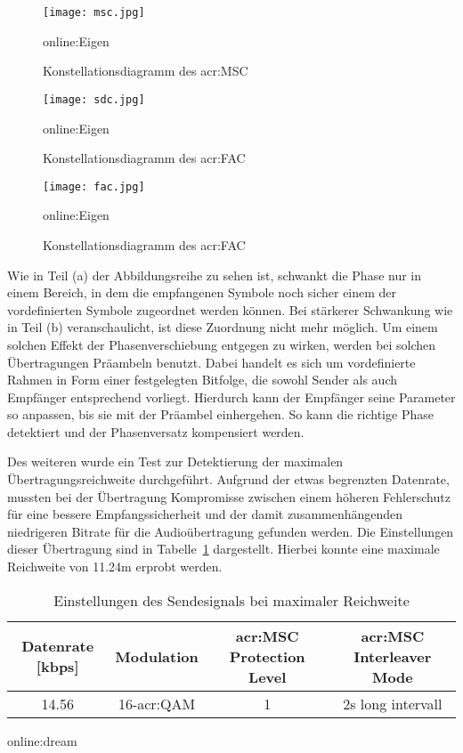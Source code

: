 \begin{figure}[h]
	\centering
	\texttt{[image: msc.jpg]}
	\caption[Konstellationsdiagramm des \gls{acr:MSC}]{Konstellationsdiagramm des \gls{acr:MSC}}\gls{online:Eigen}
	\label{fig:msc}
\end{figure}

\begin{figure}[h]
	\centering
	\texttt{[image: sdc.jpg]}
	\caption[Konstellationsdiagramm des \gls{acr:SDC}]{Konstellationsdiagramm des \gls{acr:FAC}}\gls{online:Eigen}
	\label{fig:sdc}
\end{figure}

\begin{figure}[h]
	\centering
	\texttt{[image: fac.jpg]}
	\caption[Konstellationsdiagramm des \gls{acr:FAC}]{Konstellationsdiagramm des \gls{acr:FAC}}\gls{online:Eigen}
	\label{fig:fac}
\end{figure}

Wie in Teil (a) der Abbildungsreihe zu sehen ist, schwankt die Phase nur in einem Bereich, in dem die empfangenen Symbole noch sicher einem der vordefinierten Symbole zugeordnet werden können. Bei stärkerer Schwankung wie in Teil (b) veranschaulicht, ist diese Zuordnung nicht mehr möglich. Um einem solchen Effekt der Phasenverschiebung entgegen zu wirken, werden bei solchen Übertragungen Präambeln benutzt. Dabei handelt es sich um vordefinierte Rahmen in Form einer festgelegten Bitfolge, die sowohl Sender als auch Empfänger entsprechend vorliegt. Hierdurch kann der Empfänger seine Parameter so anpassen, bis sie mit der Präambel einhergehen. So kann die richtige Phase detektiert und der Phasenversatz kompensiert werden.

Des weiteren wurde ein Test zur Detektierung der maximalen Übertragungsreichweite durchgeführt. Aufgrund der etwas begrenzten Datenrate, mussten bei der Übertragung Kompromisse zwischen einem höheren Fehlerschutz für eine bessere Empfangssicherheit und der damit zusammenhängenden niedrigeren Bitrate für die Audioübertragung gefunden werden. Die Einstellungen dieser Übertragung sind in Tabelle~\ref{tab:drmmax} dargestellt. Hierbei konnte eine maximale Reichweite von 11.24m erprobt werden.

\begin{table}[h]
	\begin{center}
		\begin{tabular}{cccc}
			\toprule
			\textbf{Datenrate [kbps]} & \textbf{Modulation}& \textbf{\gls{acr:MSC} Protection Level} & \textbf{\gls{acr:MSC} Interleaver Mode}\\
			\midrule
			
			14.56 &16-\gls{acr:QAM} & 1 & 2s long intervall\\
		
			\bottomrule
		\end{tabular}
		\caption{Einstellungen des Sendesignals bei maximaler Reichweite}\gls{online:dream}
		\label{tab:drmmax}
	\end{center}
\end{table}


 